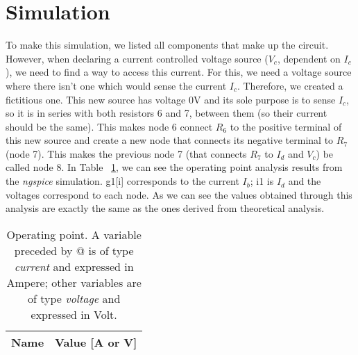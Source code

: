\section{Simulation}
\label{sec:simulation}
To make this simulation, we listed all components that make up the circuit. However, when declaring a current controlled voltage source ($V_c$, dependent on $I_c$), we need to find a way to access this current. For this, we need a voltage source where there isn't one which would sense the current $I_c$. Therefore, we created a fictitious one. This new source has voltage 0V and its sole purpose is to sense $I_c$, so it is in series with both resistors 6 and 7, between them (so their current should be the same). This makes node 6 connect $R_6$ to the positive terminal of this new source and create a new node that connects its negative terminal to $R_7$ (node 7). This makes the previous node 7 (that connects $R_7$ to $I_d$ and $V_c$) be called node 8.
In Table ~\ref{tab:op}, we can see the operating point analysis results from the \textit{ngspice} simulation. g1[i] corresponds to the current $I_b$; i1 is $I_d$ and the voltages correspond to each node. As we can see the values obtained through this analysis are exactly the same as the ones derived from theoretical analysis.
\begin{table}[H]
  \centering
  \begin{tabular}{|l|r|}
    \hline    
    {\bf Name} & {\bf Value [A or V]} \\ \hline
    
  \end{tabular}
  \caption{Operating point. A variable preceded by @ is of type {\em current}
    and expressed in Ampere; other variables are of type {\it voltage} and expressed in
    Volt.}
  \label{tab:op}
\end{table}
